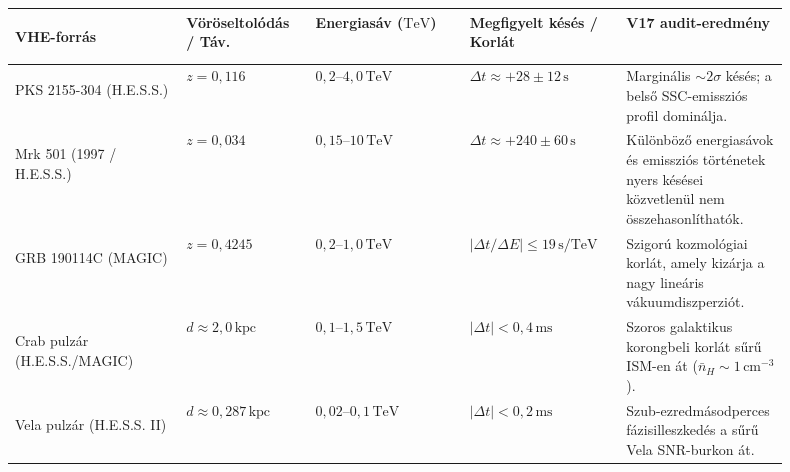\documentclass[10pt,a4paper]{article}
\begin{document}
\begin{center}\vspace{-2pt}
{\footnotesize
\begin{tabular}{@{}>{\bfseries\raggedright\arraybackslash}p{0.20\linewidth}>{\raggedright\arraybackslash}p{0.15\linewidth}>{\raggedright\arraybackslash}p{0.18\linewidth}>{\raggedright\arraybackslash}p{0.18\linewidth}>{\raggedright\arraybackslash}p{0.19\linewidth}@{}}
\toprule
VHE-forr\'as & V\"or\"oseltol\'od\'as / T\'av. & Energias\'av ($\text{TeV}$) & Megfigyelt k\'es\'es / Korl\'at & V17 audit-eredm\'eny \\
\midrule
PKS 2155-304 (H.E.S.S.) & $z = 0{,}116$ & $0{,}2\text{--}4{,}0\,\text{TeV}$ & $\Delta t \approx +28 \pm 12\,\text{s}$ & Margin\'alis $\sim 2\sigma$ k\'es\'es; a bels\H{o} SSC-emisszi\'os profil domin\'alja. \\
Mrk 501 (1997 / H.E.S.S.) & $z = 0{,}034$ & $0{,}15\text{--}10\,\text{TeV}$ & $\Delta t \approx +240 \pm 60\,\text{s}$ & K\"ul\"onb\"oz\H{o} energias\'avok \'es emisszi\'os t\"ort\'enetek nyers k\'es\'esei k\"ozvetlen\"ul nem \"osszehasonl\'ithat\'ok. \\
GRB 190114C (MAGIC) & $z = 0{,}4245$ & $0{,}2\text{--}1{,}0\,\text{TeV}$ & $|\Delta t / \Delta E| \le 19\,\text{s/TeV}$ & Szigor\'u kozmol\'ogiai korl\'at, amely kiz\'arja a nagy line\'aris v\'akuumdiszperzi\'ot. \\
Crab pulz\'ar (H.E.S.S./MAGIC) & $d \approx 2{,}0\,\text{kpc}$ & $0{,}1\text{--}1{,}5\,\text{TeV}$ & $|\Delta t| < 0{,}4\,\text{ms}$ & Szoros galaktikus korongbeli korl\'at s\H{u}r\H{u} ISM-en \'at ($\bar{n}_H \sim 1\,\text{cm}^{-3}$). \\
Vela pulz\'ar (H.E.S.S. II) & $d \approx 0{,}287\,\text{kpc}$ & $0{,}02\text{--}0{,}1\,\text{TeV}$ & $|\Delta t| < 0{,}2\,\text{ms}$ & Szub-ezredm\'asodperces f\'azisilleszked\'es a s\H{u}r\H{u} Vela SNR-burkon \'at. \\
\bottomrule
\end{tabular}}
\end{center}
\end{document}
